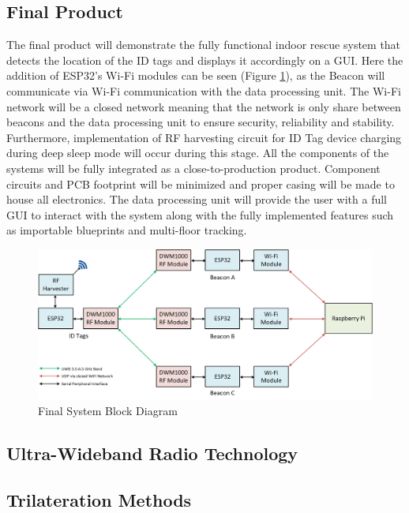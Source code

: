 \subsection{Final Product}
\medskip
The final product will demonstrate the fully functional indoor rescue system that detects the location of the ID tags and displays it accordingly on a GUI. Here the addition of ESP32’s Wi-Fi modules can be seen (Figure \ref{final}), as the Beacon will communicate via Wi-Fi communication with the data processing unit. The Wi-Fi network will be a closed network meaning that the network is only share between beacons and the data processing unit to ensure security, reliability and stability. Furthermore, implementation of RF harvesting circuit for ID Tag device charging during deep sleep mode will occur during this stage. All the components of the systems will be fully integrated as a close-to-production product. Component circuits and PCB footprint will be minimized and proper casing will be made to house all electronics. The data processing unit will provide the user with a full GUI to interact with the system along with the fully implemented features such as importable blueprints and multi-floor tracking.

\medskip
\begin{figure}[H]
\centering
    \includegraphics[width=\linewidth]{./images/03_final.png}
    \caption{Final System Block Diagram}
    \label{final}
\end{figure}




\pagebreak
\subsection{Ultra-Wideband Radio Technology}
\medskip



\pagebreak
\subsection{Trilateration Methods}


